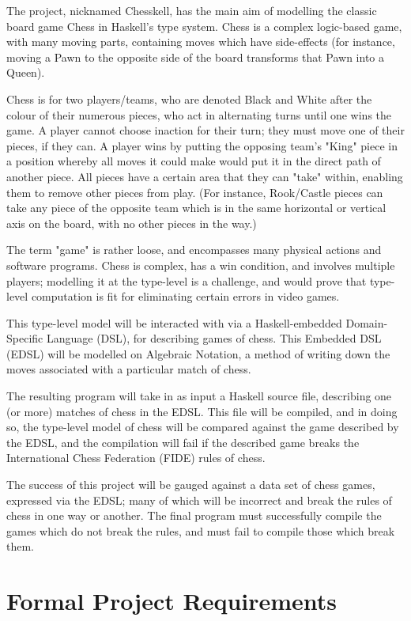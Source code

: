 \documentclass[12pt, a4paper]{scrartcl}
\begin{document}
The project, nicknamed Chesskell, has the main aim of modelling the classic board game Chess in Haskell's type system. Chess is a complex logic-based game, with many moving parts, containing moves which have side-effects (for instance, moving a Pawn to the opposite side of the board transforms that Pawn into a Queen).

Chess is for two players/teams, who are denoted Black and White after the colour of their numerous pieces, who act in alternating turns until one wins the game. A player cannot choose inaction for their turn; they must move one of their pieces, if they can. A player wins by putting the opposing team's "King" piece in a position whereby all moves it could make would put it in the direct path of another piece. All pieces have a certain area that they can "take" within, enabling them to remove other pieces from play. (For instance, Rook/Castle pieces can take any piece of the opposite team which is in the same horizontal or vertical axis on the board, with no other pieces in the way.)

The term "game" is rather loose, and encompasses many physical actions and software programs. Chess is complex, has a win condition, and involves multiple players; modelling it at the type-level is a challenge, and would prove that type-level computation is fit for eliminating certain errors in video games.

This type-level model will be interacted with via a Haskell-embedded Domain-Specific Language (DSL), for describing games of chess. This Embedded DSL (EDSL) will be modelled on Algebraic Notation, a method of writing down the moves associated with a particular match of chess.

The resulting program will take in as input a Haskell source file, describing one (or more) matches of chess in the EDSL. This file will be compiled, and in doing so, the type-level model of chess will be compared against the game described by the EDSL, and the compilation will fail if the described game breaks the International Chess Federation (FIDE) rules of chess.

The success of this project will be gauged against a data set of chess games, expressed via the EDSL; many of which will be incorrect and break the rules of chess in one way or another. The final program must successfully compile the games which do not break the rules, and must fail to compile those which break them.

\section{Formal Project Requirements}
\end{document}
